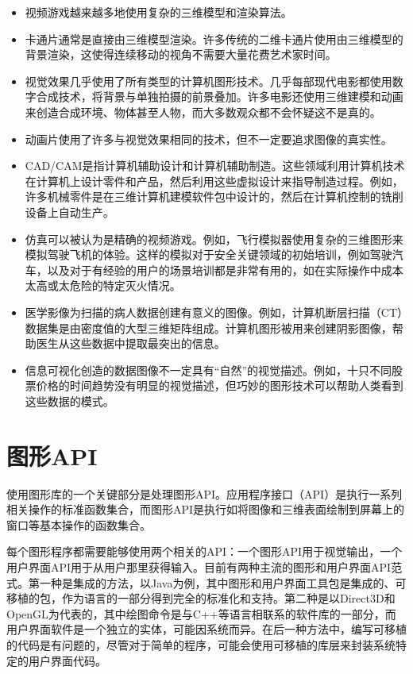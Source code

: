 \documentclass[lang=cn,12pt]{elegantbook}
\begin{document}
\begin{itemize}
\item 视频游戏越来越多地使用复杂的三维模型和渲染算法。
\item 卡通片通常是直接由三维模型渲染。许多传统的二维卡通片使用由三维模型的背景渲染，这使得连续移动的视角不需要大量花费艺术家时间。
\item 视觉效果几乎使用了所有类型的计算机图形技术。几乎每部现代电影都使用数字合成技术，将背景与单独拍摄的前景叠加。许多电影还使用三维建模和动画来创造合成环境、物体甚至人物，而大多数观众都不会怀疑这不是真的。
\item 动画片使用了许多与视觉效果相同的技术，但不一定要追求图像的真实性。
\item CAD/CAM是指计算机辅助设计和计算机辅助制造。这些领域利用计算机技术在计算机上设计零件和产品，然后利用这些虚拟设计来指导制造过程。例如，许多机械零件是在三维计算机建模软件包中设计的，然后在计算机控制的铣削设备上自动生产。
\item 仿真可以被认为是精确的视频游戏。例如，飞行模拟器使用复杂的三维图形来模拟驾驶飞机的体验。这样的模拟对于安全关键领域的初始培训，例如驾驶汽车，以及对于有经验的用户的场景培训都是非常有用的，如在实际操作中成本太高或太危险的特定灭火情况。
\item 医学影像为扫描的病人数据创建有意义的图像。例如，计算机断层扫描（CT）数据集是由密度值的大型三维矩阵组成。计算机图形被用来创建阴影图像，帮助医生从这些数据中提取最突出的信息。
\item 信息可视化创造的数据图像不一定具有“自然”的视觉描述。例如，十只不同股票价格的时间趋势没有明显的视觉描述，但巧妙的图形技术可以帮助人类看到这些数据的模式。
\end{itemize}

\section{图形API}

使用图形库的一个关键部分是处理图形API。应用程序接口（API）是执行一系列相关操作的标准函数集合，而图形API是执行如将图像和三维表面绘制到屏幕上的窗口等基本操作的函数集合。

每个图形程序都需要能够使用两个相关的API：一个图形API用于视觉输出，一个用户界面API用于从用户那里获得输入。目前有两种主流的图形和用户界面API范式。第一种是集成的方法，以Java为例，其中图形和用户界面工具包是集成的、可移植的包，作为语言的一部分得到完全的标准化和支持。第二种是以Direct3D和OpenGL为代表的，其中绘图命令是与C++等语言相联系的软件库的一部分，而用户界面软件是一个独立的实体，可能因系统而异。在后一种方法中，编写可移植的代码是有问题的，尽管对于简单的程序，可能会使用可移植的库层来封装系统特定的用户界面代码。
\end{document}
